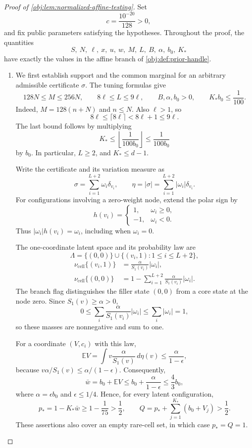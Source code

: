 \documentclass[11pt]{article}
\begin{document}
\begin{proof}[Proof of \cref{obj:lem:normalized-affine-testing}]
Set
\[
c=\frac{10^{-20}}{128}>0,
\]
and fix public parameters satisfying the hypotheses. Throughout the proof, the quantities
\[
S,\ N,\ \ell,\ x,\ u,\ w,\ M,\ L,\ B,\ \alpha,\ b_0,\ K_*
\]
have exactly the values in the affine branch of \cref{obj:def:prior-handle}.

\begin{enumerate}
\item
We first establish support and the common marginal for an arbitrary admissible certificate \(\sigma\). The tuning formulas give
\[
128N\le M\le256N,\qquad
8\ell\le L\le9\ell,\qquad
B,\alpha,b_0>0,\qquad K_*b_0\le\frac1{100}.
\]
Indeed, \(M=128(n+N)\) and \(n\le N\). Also \(\ell>1\), so
\[
8\ell\le\lceil8\ell\rceil<8\ell+1\le9\ell.
\]
The last bound follows by multiplying
\[
K_*\le\left\lfloor\frac1{100b_0}\right\rfloor
\le\frac1{100b_0}
\]
by \(b_0\). In particular, \(L\ge2\), and \(K_*\le d-1\).

Write the certificate and its variation measure as
\[
\sigma=\sum_{i=1}^{L+2}\omega_i\delta_{v_i},
\qquad
\eta=|\sigma|=\sum_{i=1}^{L+2}|\omega_i|\delta_{v_i}.
\]
For configurations involving a zero-weight node, extend the polar sign by
\[
h(v_i)=
\begin{cases}
1,&\omega_i\ge0,\\
-1,&\omega_i<0.
\end{cases}
\]
Thus \(|\omega_i|h(v_i)=\omega_i\), including when \(\omega_i=0\).

The one-coordinate latent space and its probability law are
\[
\Lambda=\{(0,0)\}\cup\{(v_i,1):1\le i\le L+2\},
\]
\[
\begin{aligned}
\nu_{\mathrm{cell}}\{(v_i,1)\}
&=\frac{\alpha}{S_1(v_i)}|\omega_i|,\\
\nu_{\mathrm{cell}}\{(0,0)\}
&=1-\sum_{i=1}^{L+2}\frac{\alpha}{S_1(v_i)}|\omega_i|.
\end{aligned}
\]
The branch flag distinguishes the filler state \((0,0)\) from a core state at the node zero. Since \(S_1(v)\ge\alpha>0\),
\[
0\le\sum_i\frac{\alpha}{S_1(v_i)}|\omega_i|
\le\sum_i|\omega_i|=1,
\]
so these masses are nonnegative and sum to one.

For a coordinate \((V,c_i)\) with this law,
\[
\mathbb EV
=\int v\frac{\alpha}{S_1(v)}\,d\eta(v)
\le\frac{\alpha}{1-\epsilon},
\]
because \(v\alpha/S_1(v)\le\alpha/(1-\epsilon)\). Consequently,
\[
\bar w=b_0+\mathbb EV
\le b_0+\frac{\alpha}{1-\epsilon}
\le\frac43b_0,
\]
where \(\alpha=\epsilon b_0\) and \(\epsilon\le1/4\). Hence, for every latent configuration,
\[
p_*=1-K_*\bar w
\ge1-\frac1{75}>\frac12,
\qquad
Q=p_*+\sum_{j=1}^{K_*}(b_0+V_j)>\frac12.
\]
These assertions also cover an empty rare-cell set, in which case \(p_*=Q=1\).


\end{enumerate}
\end{proof}
\end{document}
